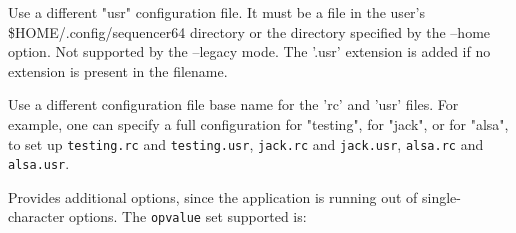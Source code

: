       Use a different "usr" configuration file.  It must be a file in the
      user's \$HOME/.config/sequencer64 directory or the directory specified by
      the --home option.  Not supported by the --legacy mode.  The '.usr'
      extension is added if no extension is present in the filename.

      Use a different configuration file base name for the 'rc' and 'usr'
      files.  For example, one can specify a full configuration for "testing",
      for "jack", or for "alsa", to set up
      \texttt{testing.rc} and \texttt{testing.usr},
      \texttt{jack.rc} and \texttt{jack.usr},
      \texttt{alsa.rc} and \texttt{alsa.usr}.

      Provides additional options, since the application is running out of
      single-character options.  The \texttt{opvalue} set supported is:
